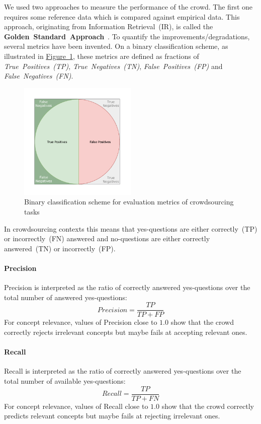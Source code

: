 \documentclass[draft,final]{vutinfth} %
\begin{document}
We used two approaches to measure the performance of the crowd. The first one requires some reference data which is compared against empirical data. This approach, originating from Information Retrieval~(IR), is called the \textbf{Golden~Standard~Approach}~\cite{brank2005}. To quantify the improvements/degradations, several metrics have been invented. On a binary classification scheme, as illustrated in \hyperref[fig:binary_classification_metrics]{Figure~\ref*{fig:binary_classification_metrics}}, these metrics are defined as fractions of \emph{True~Positives~(TP)}, \emph{True~Negatives~(TN)}, \emph{False~Positives~(FP)} and \emph{False~Negatives~(FN)}.
\begin{figure}
	 \centering
	 \includegraphics[width=0.5\textwidth]{drawio/Binary_Classification_Scheme}
	 \caption{Binary classification scheme for evaluation metrics of crowdsourcing tasks}\label{fig:binary_classification_metrics}
\end{figure}
In crowdsourcing contexts this means that yes-questions are either correctly~(TP) or incorrectly~(FN) answered and no-questions are either correctly answered~(TN) or incorrectly~(FP).

\paragraph{Precision} Precision is interpreted as the ratio of correctly answered yes-questions over the total number of answered yes-questions:
\[ Precision = \frac{TP}{TP + FP} \]
For concept relevance, values of Precision close to $1.0$ show that the crowd correctly rejects irrelevant concepts but maybe fails at accepting relevant ones. 
\paragraph{Recall} Recall is interpreted as the ratio of correctly answered yes-questions over the total number of available yes-questions:
\[ Recall = \frac{TP}{TP + FN} \]
For concept relevance, values of Recall close to $1.0$ show that the crowd correctly predicts relevant concepts but maybe fails at rejecting irrelevant ones. 
\end{document}

